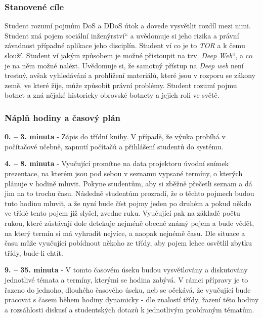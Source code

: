 \documentclass[a4paper, 12pt]{article}
\providecommand{\uv}[1]{\quotedblbase #1\textquotedblleft}
\begin{document}
\subsubsection{Stanovené cíle}
Student rozumí pojmům DoS a DDoS útok a dovede vysvětlit rozdíl mezi nimi. Student zná pojem \uv{sociální inženýrství} a uvědomuje si jeho rizika a právní závadnost případné aplikace jeho disciplín. Student ví co je to \textit{TOR} a k čemu slouží. Student ví jakým způsobem je možné přistoupit na tzv. \uv{\textit{Deep Web}}, a co je na něm možné nalézt. Uvědomuje si, že samotný přístup na \textit{Deep web} není trestný, avšak vyhledávání a prohlížení materiálů, které jsou v rozporu se zákony země, ve které žije, může způsobit právní problémy. Student rozumí pojmu botnet a zná nějaké historicky obrovské botnety a jejich roli ve světě. 

\subsubsection{Náplň hodiny a časový plán}
\indent\textbf{0. -- 3. minuta} - Zápis do třídní knihy. V případě, že výuka probíhá v počítačové učebně, zapnutí počítačů a přihlášení studentů do systému.

\textbf{4. -- 8. minuta} - Vyučující promítne na data projektoru úvodní snímek prezentace, na kterém jsou pod sebou v seznamu vypsané termíny, o kterých plánuje v hodině mluvit. Pokyne studentům, aby si zběžně přečetli seznam a dá jim na to trochu času. Následně studentům prozradí, že o těchto pojmech budou tuto hodinu mluvit, a že nyní bude číst pojmy jeden po druhém a pokud někdo ve třídě tento pojem již slyšel, zvedne ruku. Vyučující pak na základě počtu rukou, které zůstávají dole detekuje nejméně obecně známý pojem a bude vědět, na který termín si má vyhradit nejvíce, a naopak nejnémě času. Dle situace a času může vyučující pobídnout někoho ze třídy, aby pojem lehce osvětlil zbytku třídy, bude-li chtít.

\textbf{9. -- 35. minuta} - V tomto časovém úseku budou vysvětlovány a diskutovány jednotlivé témata a termíny, kterými se hodina zabývá. V rámci přípravy je to řazeno do jednoho, dlouhého časového úseku, neb se očekává, že vyučující bude pracovat s časem během hodiny dynamicky - dle znalostí třídy, řazení této hodiny a rozsáhlosti diskusí a studentských dotazů k jednotlivým probíraným tématům.
\end{document}
